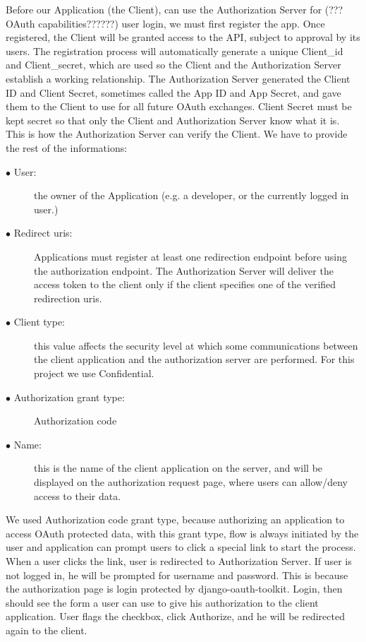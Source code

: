 Before our Application (the Client), can use the Authorization Server for (???OAuth capabilities??????) user login, we must first register the app. Once registered, the Client will be granted access to the API, subject to approval by its users. The registration process will automatically generate a unique Client\_id and Client\_secret, which are used so the Client and the Authorization Server establish a working relationship. The Authorization Server generated the Client ID and Client Secret, sometimes called the App ID and App Secret, and gave them to the Client to use for all future OAuth exchanges. Client Secret must be kept secret so that only the Client and Authorization Server know what it is. This is how the Authorization Server can verify the Client. We have to provide the rest of the informations:

\begin{description}
	
	\item[$\bullet$ User:] the owner of the Application (e.g. a developer, or the currently logged in user.)
	
	\item[$\bullet$ Redirect uris:]Applications must register at least one redirection endpoint before using the authorization endpoint. The Authorization Server will deliver the access token to the client only if the client specifies one of the verified redirection uris.
	
	\item[$\bullet$ Client type:] this value affects the security level at which some communications between the client application and the authorization server are performed. For this project we use Confidential.
	
	\item[$\bullet$ Authorization grant type:] Authorization code
	
	\item[$\bullet$ Name:] this is the name of the client application on the server, and will be displayed on the authorization request page, where users can allow/deny access to their data.
	
\end{description}

We used Authorization code grant type, because authorizing an application to access OAuth protected data, with this grant type, flow is always initiated by the user and application can prompt users to click a special link to start the process. When a user clicks the link, user is redirected to Authorization Server.  If user is not logged in, he will be prompted for username and password. This is because the authorization page is login protected by django-oauth-toolkit. Login, then should see the form a user can use to give his authorization to the client application. User flags the checkbox, click Authorize, and he will be redirected again to the client.

